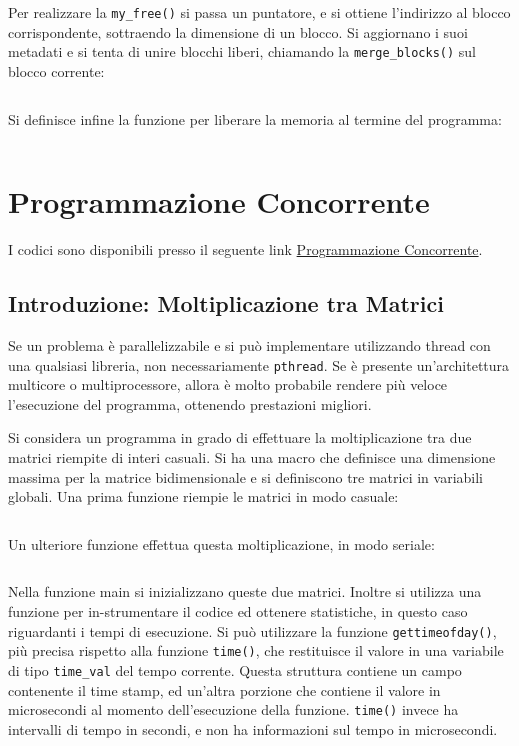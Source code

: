 \documentclass{article}
\numberwithin{equation}{subsection}
\begin{document}
Per realizzare la \verb|my_free()| si passa un puntatore, e si ottiene l'indirizzo al blocco corrispondente, sottraendo la dimensione di un blocco. Si aggiornano i suoi metadati e si tenta di unire blocchi liberi, chiamando la \verb|merge_blocks()| sul blocco corrente:
\inputminted[firstline=98,lastline=107]{c}{./Esercitazione del 19-11-24/domanda4.c}

Si definisce infine la funzione per liberare la memoria al termine del programma:
\inputminted[firstline=109,lastline=116]{c}{./Esercitazione del 19-11-24/domanda4.c}

\clearpage

\section{Programmazione Concorrente}

I codici sono disponibili presso il seguente link \href{https://github.com/00Darxk/Sistemi-Operativi/tree/main/Esercizi/Programmazione%20Concorrente/}{Programmazione Concorrente}.

\subsection{Introduzione: Moltiplicazione tra Matrici}

Se un problema è parallelizzabile e si può implementare utilizzando thread con una qualsiasi libreria, non necessariamente \verb|pthread|. Se è presente un'architettura multicore o multiprocessore, allora è molto probabile rendere più veloce 
l'esecuzione del programma, ottenendo prestazioni migliori.  


Si considera un programma in grado di effettuare la moltiplicazione tra due matrici riempite di interi casuali. Si ha una macro che definisce una dimensione massima per 
la matrice bidimensionale e si definiscono tre matrici in variabili globali. 
Una prima funzione riempie le matrici in modo casuale:
\inputminted[firstline=1, lastline=15]{c}{./Programmazione Concorrente/single.c}
Un ulteriore funzione effettua questa moltiplicazione, in modo seriale:
\inputminted[firstline=17, lastline=24, breaklines, breakanywhere]{c}{./Programmazione Concorrente/single.c}

Nella funzione main si inizializzano queste due matrici. Inoltre si utilizza una funzione per in-strumentare il codice ed ottenere statistiche, in questo caso 
riguardanti i tempi di esecuzione. Si può utilizzare la funzione \texttt{gettimeofday()}, più precisa rispetto alla funzione \verb|time()|, 
che restituisce il valore in una variabile di tipo \verb|time_val| del tempo corrente. Questa struttura contiene un campo contenente il time stamp, ed un'altra porzione che 
contiene il valore in microsecondi al momento dell'esecuzione della funzione. 
\verb|time()| invece ha intervalli di tempo in secondi, e non ha informazioni sul 
tempo in microsecondi. 
\end{document}
